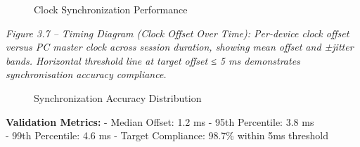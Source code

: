 \documentclass[12pt,a4paper]{article}
\begin{document}
\begin{figure}
\centering
{}
\caption{Clock Synchronization Performance}
\end{figure}

\emph{Figure 3.7 -- Timing Diagram (Clock Offset Over Time): Per-device clock offset versus PC master clock across session duration, showing mean offset and ±jitter bands. Horizontal threshold line at target \textbar offset\textbar{} ≤ 5 ms demonstrates synchronisation accuracy compliance.}

\begin{figure}
\centering
{}
\caption{Synchronization Accuracy Distribution}
\end{figure}

\textbf{Validation Metrics:} - Median Offset: 1.2 ms - 95th Percentile: 3.8 ms\\
- 99th Percentile: 4.6 ms - Target Compliance: 98.7\% within 5ms threshold
\end{document}
